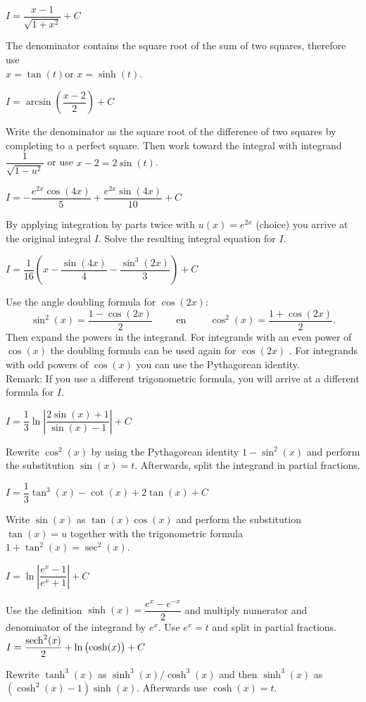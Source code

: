 \begin{Answer}
    	\Question $I = \dfrac{x-1}{\sqrt{1+x^2}} + C$
    
     The denominator contains the square root of the sum of two squares, therefore use \\ $x = \tan (t)$\ifanalysis or $x=\sinh(t)$\fi.
    	
    	\Question $I = \arcsin \left(\dfrac{x-2}{2}\right) + C$
    	
    	 Write the denominator as the square root of the difference of two squares by completing to a perfect square. Then work toward the  integral with integrand $\dfrac{1}{\sqrt{1-u^2}}$ or use $x-2 = 2 \sin (t)$.
    	
    	\Question $I = -\dfrac{e^{2x} \cos (4x)}{5} +  \dfrac{e^{2x} \sin (4x)}{10} + C$
    	
    	 By applying integration by parts twice with $u(x) = e^{2x}$ (choice) you arrive at the original integral $I$. Solve the resulting integral equation for $I$. 
    	
    	\Question $I= \dfrac{1}{16}\left( x - \dfrac{\sin (4x)}{4} - \dfrac{\sin^3 (2x)}{3} \right) + C $ 
        
        Use the angle doubling formula for $\cos (2x)$:
        \[ \sin^2 (x) = \dfrac{1-\cos (2x)}{2}\hspace{1cm}\mbox{en}\hspace{1cm} \cos^2 (x) = \dfrac{1+\cos (2x)}{2}.\]
        Then expand the powers in the integrand. For integrands with an even power of $\cos (x)$ the doubling formula can be used again for $\cos (2x)$ . For integrands with  odd powers of $\cos (x)$ you can use the Pythagorean identity.\\
        Remark:
        If you use a different trigonometric formula, you will arrive at a different formula for $I$.
    		
    	\Question $I=\dfrac{1}{3}  \ln \left|   \dfrac{2 \sin (x) + 1}{\sin (x) - 1}  \right| + C$ 
    	
    	 Rewrite $\cos^2 (x)$ by using the Pythagorean identity $1 - \sin^2 (x)$ and perform the substitution $\sin (x) = t$. Afterwards, split the integrand in partial fractions.
    	
    	\Question $I=\dfrac{1}{3} \tan^3 (x) - \cot (x) + 2 \tan (x) + C $ 
    	
    	 Write $\sin (x)$ as $\tan(x) \cos (x)$ and perform the substitution $\tan(x) = u$ together with the trigonometric formula $1 + \tan^2(x) = \sec^2(x)$.
    		
    	\ifanalysis
    	\Question $I = \ln \left| \dfrac{e^x - 1}{e^x + 1} \right| + C$ 
    	
    	 Use the definition $\sinh(x) = \dfrac{e^{x} - e^{-x}}{2}$ and multiply numerator and denominator of the integrand by $e^{x}$. Use $e^x=t$ and split in partial fractions. 
    	\Question $I = \dfrac{\operatorname{sech}^2(x)}{2} + \ln \left( \cosh(x) \right) + C$
    	
    	 Rewrite $\tanh^3(x)$ as $\sinh^3(x)/\cosh^3(x)$ and then $\sinh^3(x)$ as $(\cosh^2(x)-1)\sinh(x)$. Afterwards use $\cosh(x)=t$.
    	\fi
\end{Answer}



